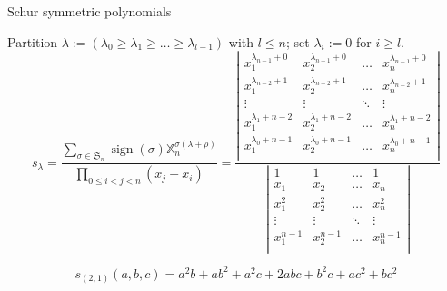 \documentclass[compress,11pt]{beamer}
\newcommand{\XX}{{\mathbb X}}
\newcommand{\SG}{{\mathfrak S}}
\renewcommand{\emph}[1]{{\color{red} #1}}
\begin{document}

\begin{frame}{Schur symmetric polynomials}

  \begin{DEFN}
    \small Partition $\lambda := (\lambda_0\geq\lambda_1\geq\dots\geq\lambda_{l-1})$ with $l\leq
    n$; set $\lambda_i:=0$ for $i\geq l$.\\

    \[
    s_{\lambda} = 
    \frac{\sum_{\sigma\in\SG_n} \operatorname{sign}(\sigma)
      \XX_n^{\sigma(\lambda+\rho)}}%
    {\prod_{0\leq i<j<n} (x_j - x_i)}
    = \frac{\left|
       \begin{smallmatrix}
         x_1^{\lambda_{n-1}+0}  & x_2^{\lambda_{n-1}+0}   & \dots  & x_n^{\lambda_{n-1}+0}  \\
         x_1^{\lambda_{n-2}+1}  & x_2^{\lambda_{n-2}+1}   & \dots  & x_n^{\lambda_{n-2}+1}  \\
         \vdots & \vdots & \ddots & \vdots \\
         x_1^{\lambda_1+n-2}  & x_2^{\lambda_1+n-2}   & \dots  & x_n^{\lambda_1+n-2}  \\
         x_1^{\lambda_0+n-1}  & x_2^{\lambda_0+n-1}   & \dots  & x_n^{\lambda_0+n-1}  \\
      \end{smallmatrix}
      \right|
    }{\left|
       \begin{smallmatrix}
         1      & 1      & \dots  & 1     \\
         x_1    & x_2    & \dots  & x_n    \\
         x_1^2  & x_2^2   & \dots  & x_n^2  \\
         \vdots & \vdots & \ddots & \vdots \\
         x_1^{n-1}  & x_2^{n-1}   & \dots  & x_n^{n-1}  \\
      \end{smallmatrix}
      \right|
    }
    \]
  \end{DEFN}
  \[s_{(2,1)}(a,b,c) = a^2b + ab^2 + a^2c + 2abc + b^2c + ac^2 + bc^2\]
\end{frame}
\end{document}
